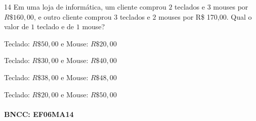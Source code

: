 
\num{14} Em uma loja de informática, um cliente comprou $2$ teclados e $3$ mouses
por $R\$160,00$, e outro cliente comprou $3$ teclados e $2$ mouses por R\$
170,00. Qual o valor de $1$ teclado e de $1$ mouse?

\begin{escolha}
\item Teclado: $R\$50,00$ e Mouse: $R\$20,00$
\item Teclado: $R\$30,00$ e Mouse: $R\$40,00$
\item Teclado: $R\$38,00$ e Mouse: $R\$48,00$
\item Teclado: $R\$20,00$ e Mouse: $R\$50,00$
\end{escolha}

\paragraph{BNCC: EF06MA14}


